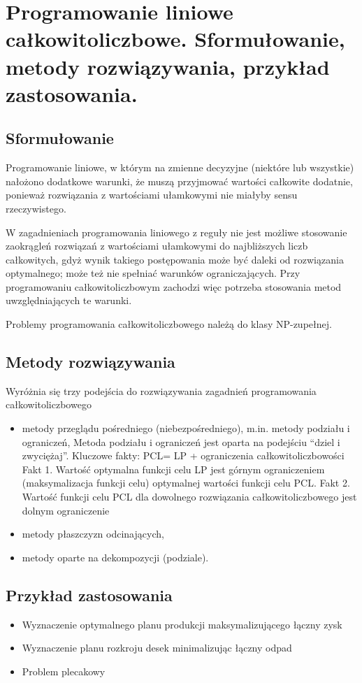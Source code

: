 \section{Programowanie liniowe całkowitoliczbowe. Sformułowanie, metody
rozwiązywania, przykład zastosowania.}
\subsection{Sformułowanie}
Programowanie liniowe, w którym na zmienne decyzyjne (niektóre lub wszystkie) nałożono dodatkowe warunki, że muszą przyjmować wartości całkowite dodatnie, ponieważ rozwiązania z wartościami ułamkowymi nie miałyby sensu rzeczywistego.

W zagadnieniach programowania liniowego z reguły nie jest możliwe stosowanie zaokrągleń rozwiązań z wartościami ułamkowymi do najbliższych liczb całkowitych, gdyż wynik takiego postępowania może być daleki od rozwiązania optymalnego; może też nie spełniać warunków ograniczających. Przy programowaniu całkowitoliczbowym zachodzi więc potrzeba stosowania metod uwzględniających te warunki.

Problemy programowania całkowitoliczbowego należą do klasy NP-zupełnej.


\subsection{Metody rozwiązywania}
Wyróżnia się trzy podejścia do rozwiązywania zagadnień programowania całkowitoliczbowego
\begin{itemize}
\item metody przeglądu pośredniego (niebezpośredniego), m.in. metody podziału i ograniczeń,
Metoda podziału i ograniczeń jest oparta na podejściu “dziel i zwyciężaj”.
Kluczowe fakty:\newline
PCL= LP + ograniczenia całkowitoliczbowości\newline
Fakt 1. Wartość optymalna funkcji celu LP jest górnym ograniczeniem (maksymalizacja
funkcji celu) optymalnej wartości funkcji celu PCL.\newline
Fakt 2. Wartość funkcji celu PCL dla dowolnego rozwiązania całkowitoliczbowego
jest dolnym ograniczenie\newline
\item metody płaszczyzn odcinających,
\item metody oparte na dekompozycji (podziale).
\end{itemize}


\subsection{Przykład zastosowania}
\begin{itemize}
\item Wyznaczenie optymalnego planu produkcji maksymalizującego łączny zysk
\item Wyznaczenie planu rozkroju desek minimalizując łączny odpad
\item Problem plecakowy
\end{itemize}
